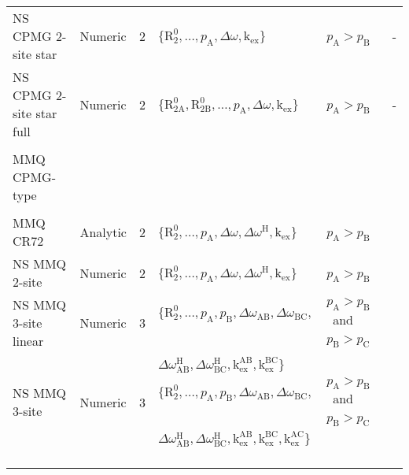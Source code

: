\documentclass[a4paper,11pt,twoside,openright]{book}
\begin{document}
{\begin{landscape}
\begin{center}
\begin{small}
\begin{longtable}{llllll}
NS CPMG 2-site star      & Numeric  & 2     & $\{\mathrm{R}_2^0, \dots, p_{\textrm{A}}, \Delta\omega , \textrm{k}_{\textrm{ex}}\}$\               & $p_{\textrm{A}}> p_{\textrm{B}}$\                        & - \\
NS CPMG 2-site star full & Numeric  & 2     & $\{\mathrm{R}_{\mathrm{2A}}^0, \mathrm{R}_{\mathrm{2B}}^0, \dots, p_{\textrm{A}}, \Delta\omega , \textrm{k}_{\textrm{ex}}\}$\  & $p_{\textrm{A}}> p_{\textrm{B}}$\                        & - \\
\par
\\
MMQ CPMG-type \\
\cline{1-1}
\\[-5pt]
MMQ CR72                 & Analytic & 2     & $\{\mathrm{R}_2^0, \dots, p_{\textrm{A}}, \Delta\omega , \Delta\omega^{\scriptscriptstyle\mathrm{H}}, \textrm{k}_{\textrm{ex}}\}$\         & $p_{\textrm{A}}> p_{\textrm{B}}$\                        & \citet{Korzhnev04a} \\
NS MMQ 2-site            & Numeric  & 2     & $\{\mathrm{R}_2^0, \dots, p_{\textrm{A}}, \Delta\omega , \Delta\omega^{\scriptscriptstyle\mathrm{H}}, \textrm{k}_{\textrm{ex}}\}$\         & $p_{\textrm{A}}> p_{\textrm{B}}$\                        & \citet{Korzhnev05b} \\
NS MMQ 3-site linear     & Numeric  & 3     & $\{\mathrm{R}_2^0, \dots, p_{\textrm{A}}, p_{\textrm{B}}, \Delta\omega_{\textrm{AB}}, \Delta\omega_{\textrm{BC}},$\        & $p_{\textrm{A}}> p_{\textrm{B}}$\  and $p_{\textrm{B}}> p_{\textrm{C}}$\        & \citet{Korzhnev05b} \\
                         &          &       & $\Delta\omega^{\scriptscriptstyle\mathrm{H}}_{\textrm{AB}}, \Delta\omega^{\scriptscriptstyle\mathrm{H}}_{\textrm{BC}}, \textrm{k}_{\textrm{ex}}^{\textrm{AB}}, \textrm{k}_{\textrm{ex}}^{\textrm{BC}}\}$\  \\
NS MMQ 3-site            & Numeric  & 3     & $\{\mathrm{R}_2^0, \dots, p_{\textrm{A}}, p_{\textrm{B}}, \Delta\omega_{\textrm{AB}}, \Delta\omega_{\textrm{BC}},$\        & $p_{\textrm{A}}> p_{\textrm{B}}$\  and $p_{\textrm{B}}> p_{\textrm{C}}$\        & \citet{Korzhnev05b} \\
                         &          &       & $\Delta\omega^{\scriptscriptstyle\mathrm{H}}_{\textrm{AB}}, \Delta\omega^{\scriptscriptstyle\mathrm{H}}_{\textrm{BC}}, \textrm{k}_{\textrm{ex}}^{\textrm{AB}}, \textrm{k}_{\textrm{ex}}^{\textrm{BC}}, \textrm{k}_{\textrm{ex}}^{\textrm{AC}}\}$\  \\

\end{longtable}
\end{small}
\end{center}
\end{landscape}}
\end{document}
